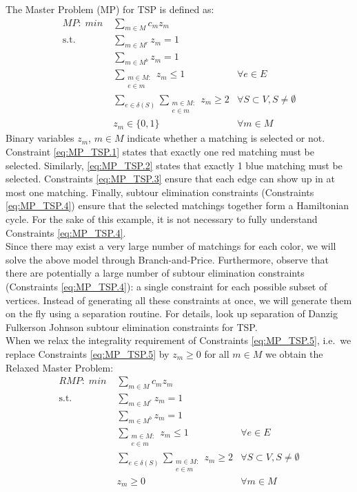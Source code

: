 \documentclass[a4paper]{article}
\begin{document}
The Master Problem (MP) for TSP is defined as:
\begin{align}
\label{eq:MP_TSP.0} \mathit{MP:}\; min\; &\sum_{m\in M} c_mz_m &\\
\label{eq:MP_TSP.1} \mbox{s.t. }&\sum_{m \in M^r} z_m = 1 & \\
\label{eq:MP_TSP.2} &\sum_{m \in M^b} z_m = 1 & \\
\label{eq:MP_TSP.3} &\sum_{\substack{m \in M:\\e\in m}} z_m \leq 1 & \forall e\in E\\
\label{eq:MP_TSP.4} &\sum_{e\in \delta(S)}\sum_{\substack{m \in M:\\e\in m}} z_m \geq 2 & \forall S\subset V, S\neq \emptyset\\
\label{eq:MP_TSP.5} &z_m\in \{0,1\} &\forall m\in M
\end{align}
Binary variables $z_m$, $m\in M$ indicate whether a matching is selected or not. Constraint \eqref{eq:MP_TSP.1} states that exactly one red matching must be selected. Similarly, \eqref{eq:MP_TSP.2} states that exactly 1 blue matching must be selected. Constraints \eqref{eq:MP_TSP.3} ensure that each edge can show up in at most one matching. Finally, subtour elimination constraints (Constraints \eqref{eq:MP_TSP.4}) ensure that the selected matchings together form a Hamiltonian cycle. For the sake of this example, it is not necessary to fully understand Constraints \eqref{eq:MP_TSP.4}.\\
Since there may exist a very large number of matchings for each color, we will solve the above model through Branch-and-Price. Furthermore, observe that there are potentially a large number of subtour elimination constraints (Constraints \eqref{eq:MP_TSP.4}): a single constraint for each possible subset of vertices. Instead of generating all these constraints at once, we will generate them on the fly using a separation routine. For details, look up separation of Danzig Fulkerson Johnson subtour elimination constraints for TSP.\\
When we relax the integrality requirement of Constraints \eqref{eq:MP_TSP.5}, i.e.\ we replace Constraints \eqref{eq:MP_TSP.5} by $z_m\geq 0$ for all $m\in M$ we obtain the Relaxed Master Problem:
\begin{align}
\label{eq:MP_TSP.6} \mathit{RMP:}\; min\; &\sum_{m\in M} c_mz_m &\\
\label{eq:MP_TSP.7} \mbox{s.t. }&\sum_{m \in M^r} z_m = 1 & \\
\label{eq:MP_TSP.8} &\sum_{m \in M^b} z_m = 1 & \\
\label{eq:MP_TSP.9} &\sum_{\substack{m \in M:\\e\in m}} z_m \leq 1 & \forall e\in E\\
\label{eq:MP_TSP.10} &\sum_{e\in \delta(S)}\sum_{\substack{m \in M:\\e\in m}} z_m \geq 2 & \forall S\subset V, S\neq \emptyset\\
\label{eq:MP_TSP.11} &z_m\geq 0 &\forall m\in M
\end{align}
\end{document}
